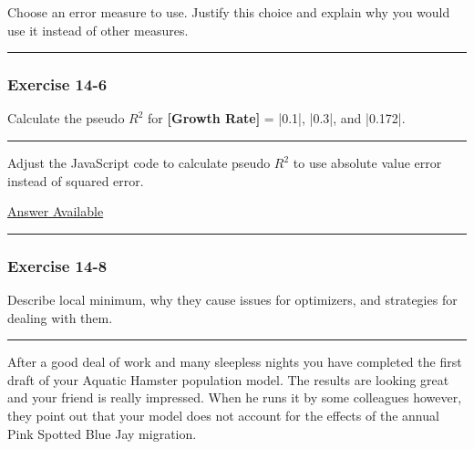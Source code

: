 \documentclass[]{memoir}
\newcommand{\FloatTok}[1]{\textcolor[rgb]{0.25,0.63,0.44}{{#1}}}
\newcommand{\p}[1]{\textbf{{[}#1{]}}}
\begin{document}
Choose an error measure to use. Justify this choice and explain why you
would use it instead of other measures.

\begin{center}\rule{3in}{0.4pt}\end{center}

\subsubsection{Exercise 14-6}

Calculate the pseudo $R^2$ for \p{Growth Rate} = |\FloatTok{0.1}|,
|\FloatTok{0.3}|, and |\FloatTok{0.172}|.

\begin{center}\rule{3in}{0.4pt}\end{center}


Adjust the JavaScript code to calculate pseudo $R^2$ to use absolute
value error instead of squared error.

\hyperref[Ans-14-7]{Answer Available}

\begin{center}\rule{3in}{0.4pt}\end{center}

\subsubsection{Exercise 14-8}

Describe local minimum, why they cause issues for optimizers, and
strategies for dealing with them.

\begin{center}\rule{3in}{0.4pt}\end{center}


After a good deal of work and many sleepless nights you have completed
the first draft of your Aquatic Hamster population model. The results
are looking great and your friend is really impressed. When he runs it
by some colleagues however, they point out that your model does not
account for the effects of the annual Pink Spotted Blue Jay migration.
\end{document}
